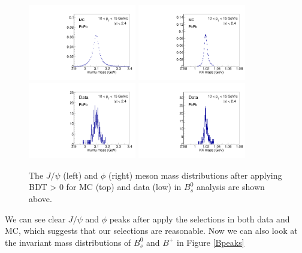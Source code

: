 \begin{figure}[h]
\begin{center}
\includegraphics[width=0.42\textwidth]{Figures/Chapter5/mc_PbPb_1_Bmumumass.pdf}
\includegraphics[width=0.42\textwidth]{Figures/Chapter5/mc_PbPb_1_Btktkmass.pdf}
\includegraphics[width=0.42\textwidth]{Figures/Chapter5/data_PbPb_1_Bmumumass.pdf}
\includegraphics[width=0.42\textwidth]{Figures/Chapter5/data_PbPb_1_Btktkmass.pdf}
\caption{The $J/\psi$ (left) and $\phi$ (right) meson mass distributions after applying BDT > 0 for MC (top) and data (low) in $B^0_s$ analysis are shown above.}
\label{mesonpeak}
\end{center}
\end{figure}

We can see clear $J/\psi$ and $\phi$ peaks after apply the selections in both data and MC, which suggests that our selections are reasonable. Now we can also look at the invariant mass distributions of $B^0_s$ and $B^+$ in Figure \ref{Bpeaks}

